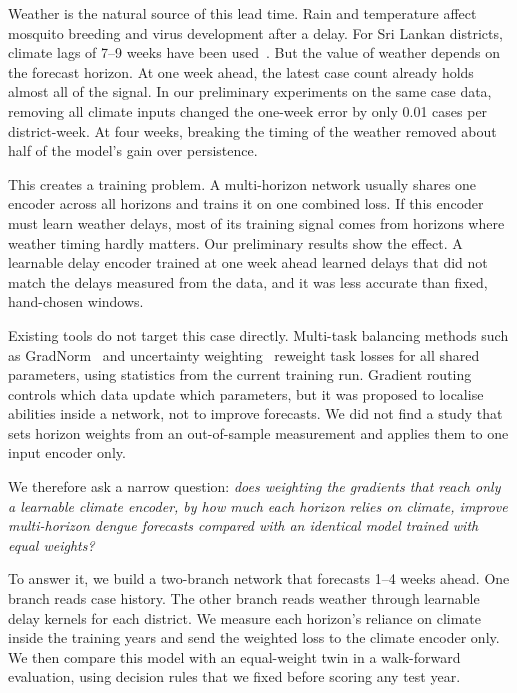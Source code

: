 \documentclass[conference]{IEEEtran}
\begin{document}
Weather is the natural source of this lead time. Rain and temperature affect mosquito breeding and virus development after a delay. For Sri Lankan districts, climate lags of 7--9 weeks have been used~\cite{liu2025explainable}. But the value of weather depends on the forecast horizon. At one week ahead, the latest case count already holds almost all of the signal. In our preliminary experiments on the same case data, removing all climate inputs changed the one-week error by only 0.01 cases per district-week. At four weeks, breaking the timing of the weather removed about half of the model's gain over persistence.

This creates a training problem. A multi-horizon network usually shares one encoder across all horizons and trains it on one combined loss. If this encoder must learn weather delays, most of its training signal comes from horizons where weather timing hardly matters. Our preliminary results show the effect. A learnable delay encoder trained at one week ahead learned delays that did not match the delays measured from the data, and it was less accurate than fixed, hand-chosen windows.

Existing tools do not target this case directly. Multi-task balancing methods such as GradNorm~\cite{chen2018gradnorm} and uncertainty weighting~\cite{kendall2018multi} reweight task losses for all shared parameters, using statistics from the current training run. Gradient routing~\cite{cloud2024gradient} controls which data update which parameters, but it was proposed to localise abilities inside a network, not to improve forecasts. We did not find a study that sets horizon weights from an out-of-sample measurement and applies them to one input encoder only.

We therefore ask a narrow question: \emph{does weighting the gradients that reach only a learnable climate encoder, by how much each horizon relies on climate, improve multi-horizon dengue forecasts compared with an identical model trained with equal weights?}

To answer it, we build a two-branch network that forecasts 1--4 weeks ahead. One branch reads case history. The other branch reads weather through learnable delay kernels for each district. We measure each horizon's reliance on climate inside the training years and send the weighted loss to the climate encoder only. We then compare this model with an equal-weight twin in a walk-forward evaluation, using decision rules that we fixed before scoring any test year.
\end{document}
